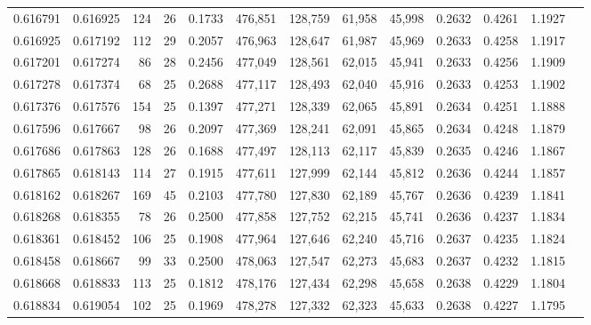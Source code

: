 \begin{tabular}{rrrrrrrrrrrrr}
0.616791 & 0.616925 &   124 &  26 &                                     0.1733 & 476,851 & 128,759 &  61,958 &  45,998 & 0.2632 & 0.4261 & 1.1927 \\
0.616925 & 0.617192 &   112 &  29 &                                     0.2057 & 476,963 & 128,647 &  61,987 &  45,969 & 0.2633 & 0.4258 & 1.1917 \\
0.617201 & 0.617274 &    86 &  28 &                                     0.2456 & 477,049 & 128,561 &  62,015 &  45,941 & 0.2633 & 0.4256 & 1.1909 \\
0.617278 & 0.617374 &    68 &  25 &                                     0.2688 & 477,117 & 128,493 &  62,040 &  45,916 & 0.2633 & 0.4253 & 1.1902 \\
0.617376 & 0.617576 &   154 &  25 &                                     0.1397 & 477,271 & 128,339 &  62,065 &  45,891 & 0.2634 & 0.4251 & 1.1888 \\
0.617596 & 0.617667 &    98 &  26 &                                     0.2097 & 477,369 & 128,241 &  62,091 &  45,865 & 0.2634 & 0.4248 & 1.1879 \\
0.617686 & 0.617863 &   128 &  26 &                                     0.1688 & 477,497 & 128,113 &  62,117 &  45,839 & 0.2635 & 0.4246 & 1.1867 \\
0.617865 & 0.618143 &   114 &  27 &                                     0.1915 & 477,611 & 127,999 &  62,144 &  45,812 & 0.2636 & 0.4244 & 1.1857 \\
0.618162 & 0.618267 &   169 &  45 &                                     0.2103 & 477,780 & 127,830 &  62,189 &  45,767 & 0.2636 & 0.4239 & 1.1841 \\
0.618268 & 0.618355 &    78 &  26 &                                     0.2500 & 477,858 & 127,752 &  62,215 &  45,741 & 0.2636 & 0.4237 & 1.1834 \\
0.618361 & 0.618452 &   106 &  25 &                                     0.1908 & 477,964 & 127,646 &  62,240 &  45,716 & 0.2637 & 0.4235 & 1.1824 \\
0.618458 & 0.618667 &    99 &  33 &                                     0.2500 & 478,063 & 127,547 &  62,273 &  45,683 & 0.2637 & 0.4232 & 1.1815 \\
0.618668 & 0.618833 &   113 &  25 &                                     0.1812 & 478,176 & 127,434 &  62,298 &  45,658 & 0.2638 & 0.4229 & 1.1804 \\
0.618834 & 0.619054 &   102 &  25 &                                     0.1969 & 478,278 & 127,332 &  62,323 &  45,633 & 0.2638 & 0.4227 & 1.1795 \\

\end{tabular}
